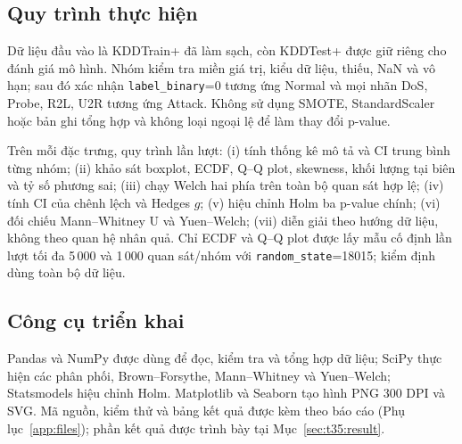 \documentclass[../main.tex]{subfiles}
\begin{document}
\subsection{Quy trình thực hiện}
\label{sec:t35:procedure}

Dữ liệu đầu vào là KDDTrain+ đã làm sạch, còn KDDTest+ được giữ riêng cho đánh giá mô
hình. Nhóm kiểm tra miền giá trị, kiểu dữ liệu, thiếu, NaN và vô hạn; sau đó xác nhận
\texttt{label\_binary}=0 tương ứng Normal và mọi nhãn DoS, Probe, R2L, U2R tương ứng
Attack. Không sử dụng SMOTE, StandardScaler hoặc bản ghi tổng hợp và không loại ngoại
lệ để làm thay đổi p-value.

Trên mỗi đặc trưng, quy trình lần lượt: (i) tính thống kê mô tả và CI trung bình từng
nhóm; (ii) khảo sát boxplot, ECDF, Q--Q plot, skewness, khối lượng tại biên và tỷ số
phương sai; (iii) chạy Welch hai phía trên toàn bộ quan sát hợp lệ; (iv) tính CI của
chênh lệch và Hedges $g$; (v) hiệu chỉnh Holm ba p-value chính; (vi) đối chiếu
Mann--Whitney U và Yuen--Welch; (vii) diễn giải theo hướng dữ liệu, không theo quan hệ
nhân quả. Chỉ ECDF và Q--Q plot được lấy mẫu cố định lần lượt tối đa 5\,000 và 1\,000
quan sát/nhóm với \texttt{random\_state}=18015; kiểm định dùng toàn bộ dữ liệu.

\subsection{Công cụ triển khai}
\label{sec:t35:tools}

Pandas và NumPy được dùng để đọc, kiểm tra và tổng hợp dữ liệu; SciPy thực hiện các
phân phối, Brown--Forsythe, Mann--Whitney và Yuen--Welch; Statsmodels hiệu chỉnh Holm.
Matplotlib và Seaborn tạo hình PNG 300 DPI và SVG. Mã nguồn, kiểm thử và bảng kết quả
được kèm theo báo cáo (Phụ lục~\ref{app:files}); phần kết quả được trình bày tại
Mục~\ref{sec:t35:result}.
\end{document}
